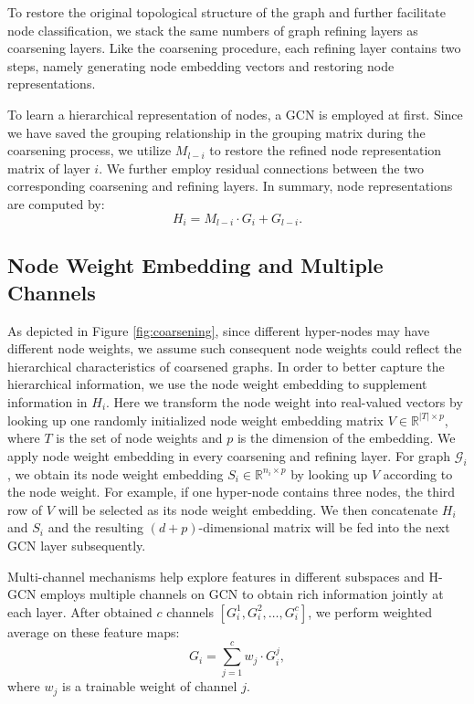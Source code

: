 \documentclass{article}
\begin{document}
To restore the original topological structure of the graph and further facilitate node classification, we stack the same numbers of graph refining layers as coarsening layers. Like the coarsening procedure, each refining layer contains two steps, namely generating node embedding vectors and restoring node representations.

To learn a hierarchical representation of nodes, a GCN is employed at first. Since we have saved the grouping relationship in the grouping matrix during the coarsening process, we utilize $M_{l - i}$ to restore the refined node representation matrix of layer $i$. We further employ residual connections between the two corresponding coarsening and refining layers. In summary, node representations are computed by:
\begin{equation}
	H_i = M_{l - i} \cdot G_i + G_{l - i}.
\end{equation}

\subsection{Node Weight Embedding and Multiple Channels}

As depicted in Figure \ref{fig:coarsening}, since different hyper-nodes may have different node weights, we assume such consequent node weights could reflect the hierarchical characteristics of coarsened graphs. In order to better capture the hierarchical information, we use the node weight embedding to supplement information in $H_i$. Here we transform the node weight into real-valued vectors by looking up one randomly initialized node weight embedding matrix $V \in \mathbb{R}^{|T|\times p}$, where $T$ is the set of node weights and $p$ is the dimension of the embedding. We apply node weight embedding in every coarsening and refining layer. For graph $\mathcal{G}_i$, we obtain its node weight embedding $S_i \in \mathbb{R}^{n_i \times p}$ by looking up $V$ according to the node weight. For example, if one hyper-node contains three nodes, the third row of $V$ will be selected as its node weight embedding. We then concatenate $H_i$ and $S_i$ and the resulting $(d+p)$-dimensional matrix will be fed into the next GCN layer subsequently.

Multi-channel mechanisms help explore features in different subspaces and H-GCN employs multiple channels on GCN to obtain rich information jointly at each layer. After obtained $c$ channels $\left[ G_{i}^{1}, G_{i}^{2}, \dots, G_{i}^{c} \right]$, we perform weighted average on these feature maps:
\begin{equation}
	G_i = \sum_{j=1}^{c} w_j \cdot G_i^j,
\end{equation}
where $w_j$ is a trainable weight of channel $j$.
\end{document}
